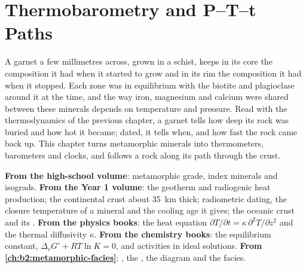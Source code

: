 \chapter{Thermobarometry and P--T--t Paths}\label{ch:b2:pt-paths}

A garnet a few millimetres across, grown in a schist, keeps in its core the composition
it had when it started to grow and in its rim the composition it had when it stopped. Each
zone was in equilibrium with the biotite and plagioclase around it at the time, and the
way iron, magnesium and calcium were shared between these minerals depends on temperature
and pressure. Read with the thermodynamics of the previous chapter, a garnet tells how
deep its rock was buried and how hot it became; dated, it tells when, and how fast the
rock came back up. This chapter turns metamorphic minerals into thermometers, barometers
and clocks, and follows a rock along its path through the crust.

\begin{recall}
\textbf{From the high-school volume}: metamorphic grade, index minerals and isograds.
\textbf{From the Year 1 volume}: the geotherm and radiogenic heat production; the
continental crust about \qty{35}{km} thick; radiometric dating, the closure temperature
of a mineral and the cooling age it gives; the oceanic crust and its .
\textbf{From the physics books}: the heat equation $\partial T/\partial t = \kappa\,
\partial^2 T/\partial z^2$ and the thermal diffusivity $\kappa$. \textbf{From the chemistry
books}: the equilibrium constant, $\Delta_r G^\circ + RT\ln K = 0$, and activities in
ideal solutions. \textbf{From \cref{ch:b2:metamorphic-facies}}: ,
the , the  diagram and the facies.
\end{recall}

